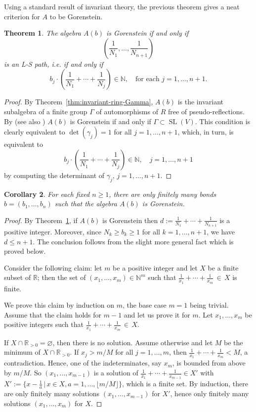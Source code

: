 \documentclass[12pt, a4paper]{amsart}   	%
\numberwithin{equation}{section}
\theoremstyle{plain}
\newtheorem{theorem}{Theorem}[section]
\newtheorem{corollary}[theorem]{Corollary}
\theoremstyle{definition}
\newcommand{\R}{{\mathbb R}}
\DeclareMathOperator{\SL}{SL}
\newcommand{\NN}{\mathbb{N}}
\newcommand{\RR}{\mathbb{R}}
\begin{document}
Using a standard result of invariant theory, the previous theorem gives a neat criterion for $A$ to be Gorenstein.
\begin{theorem}\label{thm:Gorenstein}
The algebra $A(b)$ is Gorenstein if and only if
\[
\displaystyle(\frac{1}{N_1},\ldots,\frac{1}{N_{n+1}})
\]
is an L-S path, i.e. if and only if
\[
b_j\cdot\left(\frac{1}{N_1} + \cdots + \frac{1}{N_j}\right) \in \NN, \quad \textrm{for each } j = 1, \ldots, n + 1.
\]
\end{theorem}
\begin{proof}
    By Theorem~\ref{thm:invariant-ring-Gamma}, $A(b)$ is the invariant subalgebra of a finite group $\Gamma$ of automorphisms of $ R$ free of pseudo-reflections. By \cite{WatanabeI, WatanabeII} (see also \cite{BrunsHerzog}) $A(b)$ is Gorenstein if and only if $\Gamma \subset \SL( V)$. This condition is clearly equivalent to $\det(\gamma_j) = 1$ for all $j = 1, \ldots, n+1$, which, in turn, is equivalent to
    \[
    b_j\cdot\left(\frac{1}{N_1} + \cdots + \frac{1}{N_j}\right) \in \NN, \quad j = 1, \ldots, n+1
    \]
    by computing the determinant of $\gamma_j$, $j = 1,\ldots, n+1$.
\end{proof}

\begin{corollary}\label{cor:Gorenstein}
    For each fixed $n\geq 1$, there are only finitely many bonds $b = (b_1, \ldots, b_n)$ such that the algebra $A(b)$ is Gorenstein.
\end{corollary}
\begin{proof}
    By Theorem~\ref{thm:Gorenstein}, if $A(b)$ is Gorenstein then $d := \frac{1}{N_1} + \cdots + \frac{1}{N_{n+1}}$ is a positive integer. Moreover, since $N_k \geq b_k \geq 1$ for all $k = 1, \ldots, n+1$, we have $d \leq n + 1$. The conclusion follows from the slight more general fact which is proved below.

    Consider the following claim: let $m$ be a positive integer and let $X$ be a finite subset of $\R$; then the set of $(x_1, \ldots, x_m)\in\NN^m$ such that $\frac{1}{x_1} + \cdots + \frac{1}{x_m}\,\in\,X$ is finite.

    We prove this claim by induction on $m$, the base case $m=1$ being trivial. Assume that the claim holds for $m - 1$ and let us prove it for $m$. Let $x_1, \ldots, x_m$ be positive integers such that $\frac{1}{x_1} + \cdots + \frac{1}{x_m}\,\in\,X$.

    If $X\cap\RR_{>0} = \varnothing$, then there is no solution. Assume otherwise and let $M$ be the minimum of $X\cap \R_{>0}$. If $x_j > m/M$ for all $j = 1, \ldots, m$, then $\frac{1}{x_1} + \cdots + \frac{1}{x_m} < M$, a contradiction. Hence, one of the indeterminates, say $x_m$, is bounded from above by $m/M$. So $(x_1, \ldots, x_{m-1})$ is a solution of $\frac{1}{x_1} + \cdots + \frac{1}{x_{m-1}} \in X'$ with $X' := \{x - \frac{1}{a}\,|\, x\in X, a = 1, \ldots, \lfloor m/M\rfloor\}$, which is a finite set. By induction, there are only finitely many solutions $(x_1, \ldots, x_{m-1})$ for $X'$, hence only finitely many solutions $(x_1, \ldots, x_m)$ for $X$.
\end{proof}
\end{document}
